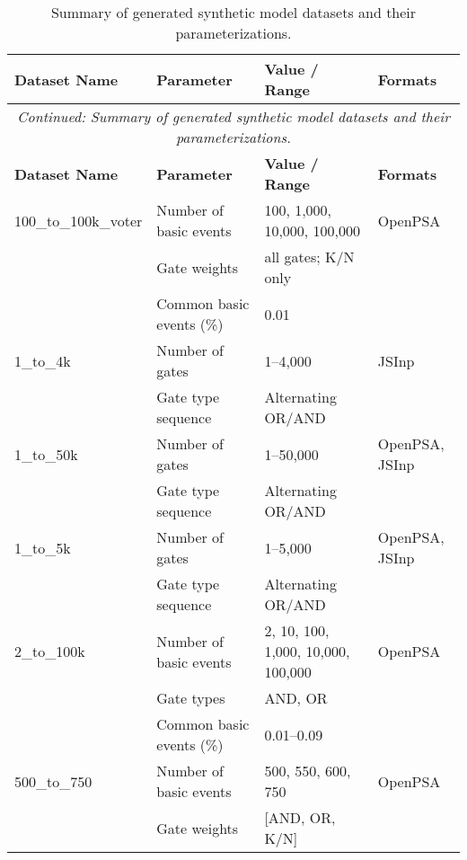 \begin{longtable}{@{}llll@{}}
\caption{Summary of generated synthetic model datasets and their parameterizations.}
\label{tab:syn_datasets_overview}\\
\toprule
\textbf{Dataset Name} & \textbf{Parameter} & \textbf{Value / Range} & \textbf{Formats} \\* \midrule
\endfirsthead
\multicolumn{4}{c}{\textit{Continued: Summary of generated synthetic model datasets and their parameterizations.}}\\
\toprule
\textbf{Dataset Name} & \textbf{Parameter} & \textbf{Value / Range} & \textbf{Formats} \\* \midrule
\endhead
%
\bottomrule
\endfoot
%
\endlastfoot

100\_to\_100k\_voter & Number of basic events & 100, 1,000, 10,000, 100,000 & OpenPSA \\
                     & Gate weights          & all gates; K/N only          &               \\
                     & Common basic events (\%) & 0.01                      &               \\
\midrule
1\_to\_4k & Number of gates   & 1--4,000                     & JSInp \\
                         & Gate type sequence & Alternating OR/AND           &                 \\
\midrule
1\_to\_50k           & Number of gates       & 1--50,000                     & OpenPSA, JSInp \\
                     & Gate type sequence    & Alternating OR/AND            &                 \\
\midrule
1\_to\_5k            & Number of gates       & 1--5,000                      & OpenPSA, JSInp \\
                     & Gate type sequence    & Alternating OR/AND            &                 \\
\midrule
2\_to\_100k          & Number of basic events & 2, 10, 100, 1,000, 10,000, 100,000 & OpenPSA \\
                     & Gate types            & AND, OR                       &                 \\
                     & Common basic events (\%) & 0.01--0.09                 &                 \\
\midrule
500\_to\_750         & Number of basic events & 500, 550, 600, 750            & OpenPSA \\
                     & Gate weights           & [AND, OR, K/N]                &          \\

\end{longtable}
